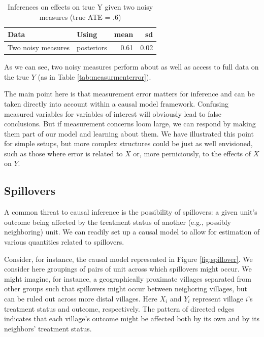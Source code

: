 \documentclass[
  12pt,
]{book}
\begin{document}
\begin{table}

\caption{\label{tab:measurementerror2}Inferences on effects on true Y given two noisy measures  (true ATE = .6)}
\centering
\begin{tabular}[t]{l|l|r|r}
\hline
Data & Using & mean & sd\\
\hline
Two noisy measures & posteriors & 0.61 & 0.02\\
\hline
\end{tabular}
\end{table}

As we can see, two noisy measures perform about as well as access to full data on the true \(Y\) (as in Table \ref{tab:measurmenterror}).

The main point here is that measurement error matters for inference and can be taken directly into account within a causal model framework. Confusing measured variables for variables of interest will obviously lead to false conclusions. But if measurement concerns loom large, we can respond by making them part of our model and learning about them. We have illustrated this point for simple setups, but more complex structures could be just as well envisioned, such as those where error is related to \(X\) or, more perniciously, to the effects of \(X\) on \(Y\).

\hypertarget{spillovers}{%
\subsection{Spillovers}\label{spillovers}}

A common threat to causal inference is the possibility of spillovers: a given unit's outcome being affected by the treatment status of another (e.g., possibly neighboring) unit. We can readily set up a causal model to allow for estimation of various quantities related to spillovers.

Consider, for instance, the causal model represented in Figure \ref{fig:spillover}. We consider here groupings of pairs of unit across which spillovers might occur. We might imagine, for instance, a geographically proximate villages separated from other groups such that spillovers might occur between neighoring villages, but can be ruled out across more distal villages. Here \(X_i\) and \(Y_i\) represent village \(i\)'s treatment status and outcome, respectively. The pattern of directed edges indicates that each village's outcome might be affected both by its own and by its neighbors' treatment status.
\end{document}
